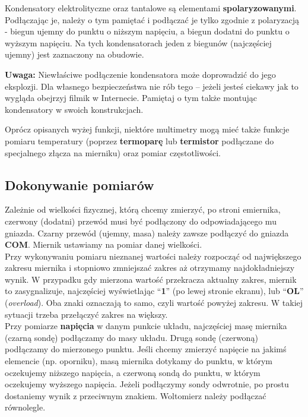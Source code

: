 \documentclass{pdfBooklets}
\begin{document}
\begin{ProTip}{}
  Kondensatory elektrolityczne oraz tantalowe są elementami \textbf{spolaryzowanymi}. Podłączając je, należy o tym pamiętać i podłączać je
  tylko zgodnie z polaryzacją - biegun ujemny do punktu o niższym napięciu, a biegun dodatni do punktu o wyższym napięciu. Na tych kondensatorach jeden
  z biegunów (najczęściej ujemny) jest zaznaczony na obudowie.
  
  \textbf{Uwaga:} Niewłaściwe podłączenie kondensatora może doprowadzić do jego eksplozji.
  Dla własnego bezpieczeństwa nie rób tego – jeżeli jesteś ciekawy jak to wygląda obejrzyj filmik w Internecie.
  Pamiętaj o tym także montując kondensatory w swoich konstrukcjach.
\end{ProTip}

Oprócz opisanych wyżej funkcji, niektóre multimetry mogą mieć także funkcje pomiaru temperatury (poprzez \textbf{termoparę}
lub \textbf{termistor} podłączane do
specjalnego złącza na mierniku) oraz pomiar częstotliwości.

\subsection{Dokonywanie pomiarów}

Zależnie od wielkości fizycznej, którą chcemy zmierzyć, po stroni emiernika, czerwony (dodatni) przewód musi być podłączony do odpowiadającego
mu gniazda. Czarny przewód (ujemny, masa) należy zawsze podłączyć do gniazda \textbf{COM}. Miernik ustawiamy na pomiar danej
wielkości.
\\

Przy wykonywaniu pomiaru nieznanej wartości należy rozpocząć od największego zakresu miernika i stopniowo zmniejszać zakres aż
otrzymamy najdokładniejszy wynik. W przypadku gdy mierzona wartość przekracza aktualny zakres, miernik to zasygnalizuje, najczęściej
wyświetlając ``\textbf{1}'' (po lewej stronie ekranu), lub ``\textbf{OL}'' (\emph{overload}). Oba znaki oznaczają to samo, czyli wartość powyżej zakresu. W takiej sytuacji trzeba przełączyć zakres na większy.
\\

Przy pomiarze \textbf{napięcia} w danym punkcie układu, najczęściej masę miernika (czarną sondę)
podłączamy do masy układu. Drugą sondę (czerwoną) podłączamy do mierzonego punktu. Jeśli chcemy zmierzyć napięcie na jakimś elemencie (np. oporniku),
masą miernika dotykamy do punktu, w którym oczekujemy niższego napięcia, a czerwoną sondą do punktu, w którym oczekujemy
wyższego napięcia. Jeżeli podłączymy sondy odwrotnie, po prostu dostaniemy wynik z przeciwnym znakiem. Woltomierz należy podłączać równolegle.
\\
\end{document}

